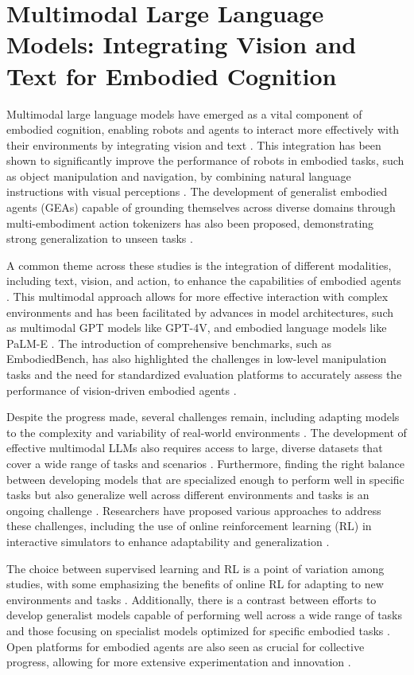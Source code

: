 \documentclass[conference]{IEEEtran}
\begin{document}
\section{Multimodal Large Language Models: Integrating Vision and Text for Embodied Cognition}
Multimodal large language models have emerged as a vital component of embodied cognition, enabling robots and agents to interact more effectively with their environments by integrating vision and text \cite{b1}. This integration has been shown to significantly improve the performance of robots in embodied tasks, such as object manipulation and navigation, by combining natural language instructions with visual perceptions \cite{b2}. The development of generalist embodied agents (GEAs) capable of grounding themselves across diverse domains through multi-embodiment action tokenizers has also been proposed, demonstrating strong generalization to unseen tasks \cite{b3}.

A common theme across these studies is the integration of different modalities, including text, vision, and action, to enhance the capabilities of embodied agents \cite{b4}. This multimodal approach allows for more effective interaction with complex environments and has been facilitated by advances in model architectures, such as multimodal GPT models like GPT-4V, and embodied language models like PaLM-E \cite{b5}. The introduction of comprehensive benchmarks, such as EmbodiedBench, has also highlighted the challenges in low-level manipulation tasks and the need for standardized evaluation platforms to accurately assess the performance of vision-driven embodied agents \cite{b6}.

Despite the progress made, several challenges remain, including adapting models to the complexity and variability of real-world environments \cite{b7}. The development of effective multimodal LLMs also requires access to large, diverse datasets that cover a wide range of tasks and scenarios \cite{b8}. Furthermore, finding the right balance between developing models that are specialized enough to perform well in specific tasks but also generalize well across different environments and tasks is an ongoing challenge \cite{b9}. Researchers have proposed various approaches to address these challenges, including the use of online reinforcement learning (RL) in interactive simulators to enhance adaptability and generalization \cite{b10}.

The choice between supervised learning and RL is a point of variation among studies, with some emphasizing the benefits of online RL for adapting to new environments and tasks \cite{b11}. Additionally, there is a contrast between efforts to develop generalist models capable of performing well across a wide range of tasks and those focusing on specialist models optimized for specific embodied tasks \cite{b12}. Open platforms for embodied agents are also seen as crucial for collective progress, allowing for more extensive experimentation and innovation \cite{b13}.
\end{document}
